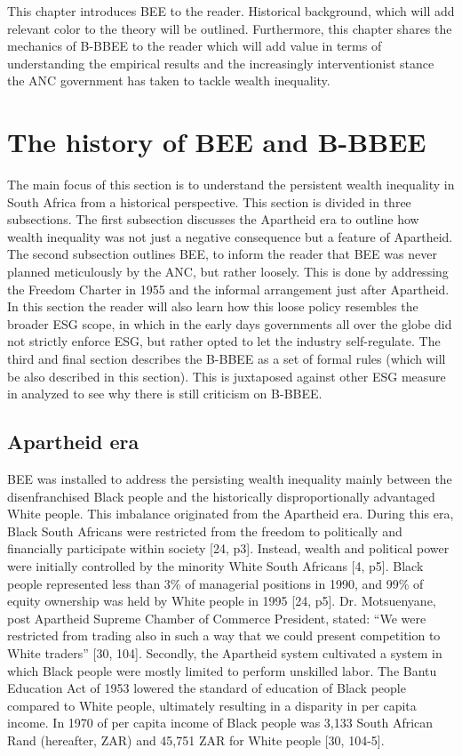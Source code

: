 This chapter introduces BEE to the reader. Historical background, which will add relevant color to the theory will be outlined. Furthermore, this chapter shares the mechanics of B-BBEE to the reader which will add value in terms of understanding the empirical results and the increasingly interventionist stance the ANC government has taken to tackle wealth inequality.
\section{The history of BEE and B-BBEE}
The main focus of this section is to understand the persistent wealth inequality in South Africa from a historical perspective. This section is divided in three subsections. The first subsection discusses the Apartheid era to outline how wealth inequality was not just a negative consequence but a feature of Apartheid. The second subsection outlines BEE, to inform the reader that BEE was never planned meticulously by the ANC, but rather loosely. This is done by addressing the Freedom Charter in 1955 and the informal arrangement just after Apartheid. In this section the reader will also learn how this loose policy resembles the broader ESG scope, in which in the early days governments all over the globe did not strictly enforce ESG, but rather opted to let the industry self-regulate. The third and final section describes the B-BBEE as a set of formal rules (which will be also described in this section). This is juxtaposed against other ESG measure in analyzed to see why there is still criticism on B-BBEE.
\subsection{Apartheid era}
BEE was installed to address the persisting wealth inequality mainly between the disenfranchised Black people and the historically disproportionally advantaged White people. This imbalance originated from the Apartheid era. During this era, Black South Africans were restricted from the freedom to politically and financially participate within society [24, p3]. Instead, wealth and political power were initially controlled by the minority White South Africans [4, p5].  Black people represented less than 3\% of managerial positions in 1990, and 99\% of equity ownership was held by White people in 1995 [24, p5]. Dr. Motsuenyane, post Apartheid Supreme Chamber of Commerce President, stated: “We were restricted from trading also in such a way that we could present competition to White traders” [30, 104]. Secondly, the Apartheid system cultivated a system in which Black people were mostly limited to perform unskilled labor. The Bantu Education Act of 1953 lowered the standard of education of Black people compared to White people, ultimately resulting in a disparity in per capita income. In 1970 of per capita income of Black people was 3,133 South African Rand (hereafter, ZAR) and 45,751 ZAR for White people [30, 104-5].

